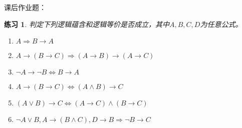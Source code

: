 \documentclass{article}
\newtheorem{Exercise}{练习}
\begin{document}
\begin{CJK}{UTF8}{gbsn}
  课后作业题：
  \begin{Exercise}
    判定下列逻辑蕴含和逻辑等价是否成立，其中$A,B,C,D$为任意公式。
    \begin{enumerate}
      \item $A\Rightarrow  B\to A$
      \item $A\to (B\to C)\Rightarrow (A\to B)\to (A\to C)$
      \item $\lnot A\to \lnot B\Leftrightarrow B\to A$
      \item $A\to (B\to C)\Leftrightarrow (A\land B)\to C$
      \item $(A\lor B)\to C\Leftrightarrow (A\to C)\land (B\to C)$
      \item $\lnot A\lor B,A\to (B\land C),D\to B\Rightarrow \lnot B\to C$   
    \end{enumerate}
  \end{Exercise}
  







\end{CJK}
\end{document}
